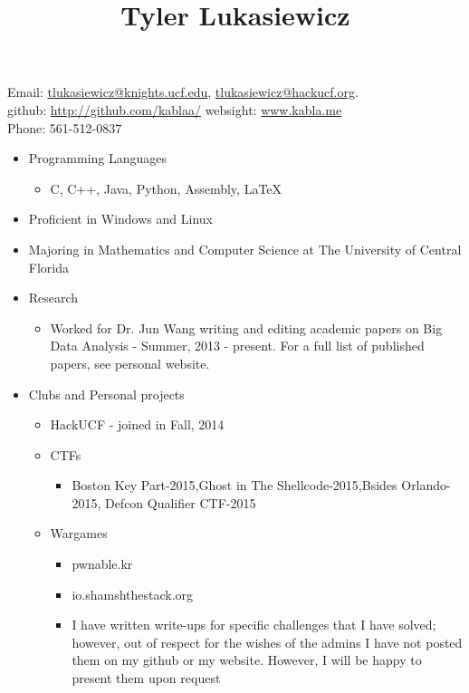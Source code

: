 \documentclass[font = 22]{article}
\title{Tyler Lukasiewicz}
\date{}
\begin{document}
\maketitle

\begin{center}
    Email: \quad \href{mailto:tlukasiewicz@knights.ucf.edu}{tlukasiewicz@knights.ucf.edu}, \href{mailto:tlukasiewicz@hackucf.org}{tlukasiewicz@hackucf.org}. \\
github: \url{http://github.com/kablaa/} \quad websight: \url{www.kabla.me} \\
Phone: 561-512-0837 
\end{center}




\begin{itemize}
    \item Programming Languages
        \begin{itemize}
            \item C, C++, Java, Python, Assembly, LaTeX
        \end{itemize}
    \item Proficient in Windows and Linux  
    \item Majoring in Mathematics and Computer Science at The University of Central Florida 
    \item Research 
    \begin{itemize}
        \item Worked for Dr. Jun Wang writing and editing academic papers on Big Data Analysis - Summer, 2013 - present. For a full list of published papers, see personal website.
    \end{itemize}
    
    \item Clubs and Personal projects
    \begin{itemize}
        \item HackUCF - joined in Fall, 2014
        \item  CTFs
        \begin{itemize}
            \item Boston Key Part-2015,Ghost in The Shellcode-2015,Bsides Orlando-2015, Defcon Qualifier CTF-2015
        \end{itemize}
        \item Wargames
        \begin{itemize}
            \item pwnable.kr
            \item io.shamshthestack.org
            \item I have written write-ups for specific challenges that I have solved; however, out of respect for the wishes of the admins I have not posted them on my github or my website. However, I will be happy to present them upon request
        \end{itemize}
        

\end{itemize}
\end{itemize}
\end{document}
